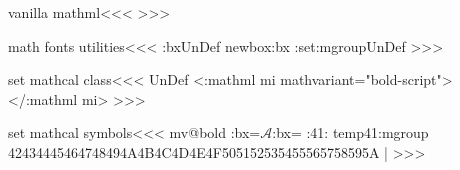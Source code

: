 {{{{{{\<vanilla mathml\><<<
   {\EndP{}} 
   {}
   {}   {}
   {}   {}
>>>














\<math fonts utilities\><<<
\ifx \tmp:bx\:UnDef \csname newbox\endcsname \tmp:bx \fi
\ifx \find:set:mgroup\:UnDef 
   \def\find:set:mgroup#1#2#3{\bgroup
     \def\use@mathgroup##1##2##3{\relax
       \tmp:cnt=##2%
       \xdef\:temp####1{\noexpand\Configure{MathClass}{#2}%
           {}{}{}{\mathchar"0\the\tmp:cnt ####1}}%
     }%
     \setbox\tmp:bx=\hbox{$#1$}\setbox\tmp:bx=\hbox{}%
     \set:mgroup#3{}{}%
     \egroup
   }
\fi
\def\set:mgroup#1#2{\if :#1#2:\else
   \:temp{#1#2}\expandafter\set:mgroup \fi}
>>>



\<set mathcal class\><<<
\ifx \mathboldcalMathClass\:UnDef
  \NewMathClass\mathboldcalMathClass
\fi
{}
    {<\a:mathml mi\Hnewline
         mathvariant="bold-script">}{</\a:mathml mi>}{}  
>>>

\<set mathcal symbols\><<<
\expandafter\ifx\csname mv@bold\endcsname\relax  \else
\bgroup
{}%
\find:set:mgroup{\mathcal{A}}{\mathboldcalMathClass}%
  {4142434445464748494A4B4C4D4E4F505152535455565758595A} |%
\egroup
\fi
>>>






}}}}}}

